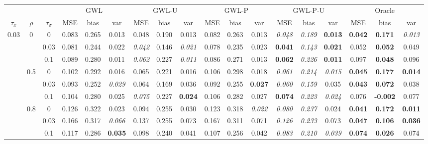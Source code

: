 \documentclass[authoryear, review, 10pt]{elsarticle}
\begin{document}
\begin{sidewaystable}[ht]
\begin{center}
\begin{tabular}{ccc|ccc|ccc|ccc|ccc|ccc}
&&&\multicolumn{3}{c}{GWL}&\multicolumn{3}{c}{GWL-U}&\multicolumn{3}{c}{GWL-P}&\multicolumn{3}{c}{GWL-P-U}&\multicolumn{3}{c}{Oracle}\\
$\tau_x$ & $\rho$ & $\tau_\sigma$ & MSE & bias & var &  MSE & bias & var &  MSE & bias & var &  MSE & bias & var &  MSE & bias & var\\ 
\hline
\multirow{9}{*}{0.03} & \multirow{3}{*}{0} & 0 & 0.083 & 0.265 & 0.013 & 0.048 & 0.190 & 0.013 & 0.082 & 0.263 & 0.013 & \emph{0.048} & \emph{0.189} & \textbf{0.013} & \textbf{0.042} & \textbf{0.171} & \emph{0.013} \\ 
 &  & 0.03 &   0.081 & 0.244 & 0.022 & \emph{0.042} & 0.146 & \emph{0.021} & 0.078 & 0.235 & 0.023 & \textbf{0.041} & \emph{0.143} & \textbf{0.021} & 0.052 & \textbf{0.052} & 0.049 \\ 
 &  & 0.1 &   0.089 & 0.280 & 0.011 & \emph{0.062} & 0.227 & \emph{0.011} & 0.086 & 0.271 & 0.013 & \textbf{0.062} & \emph{0.226} & \textbf{0.011} & 0.097 & \textbf{0.048} & 0.096 \\ \cline{2-18}
 & \multirow{3}{*}{0.5} & 0 &   0.102 & 0.292 & 0.016 & 0.065 & 0.221 & 0.016 & 0.106 & 0.298 & 0.018 & \emph{0.061} & \emph{0.214} & \emph{0.015} & \textbf{0.045} & \textbf{0.177} & \textbf{0.014} \\ 
 &  & 0.03 &   0.093 & 0.252 & \emph{0.029} & 0.064 & 0.169 & 0.036 & 0.092 & 0.255 & \textbf{0.027} & \emph{0.060} & \emph{0.159} & 0.035 & \textbf{0.043} & \textbf{0.072} & 0.038 \\ 
 &  & 0.1 &   0.104 & 0.280 & 0.025 & \emph{0.075} & 0.227 & \textbf{0.024} & 0.106 & 0.282 & 0.027 & \textbf{0.074} & \emph{0.223} & \emph{0.024} & 0.076 & \textbf{-0.002} & 0.077 \\ \cline{2-18}
 & \multirow{3}{*}{0.8} & 0 &   0.126 & 0.322 & 0.023 & 0.094 & 0.255 & 0.030 & 0.123 & 0.318 & \emph{0.022} & \emph{0.080} & \emph{0.237} & 0.024 & \textbf{0.041} & \textbf{0.172} & \textbf{0.011} \\ 
 &  & 0.03 &   0.166 & 0.317 & \emph{0.066} & 0.137 & 0.255 & 0.073 & 0.167 & 0.311 & 0.071 & \emph{0.126} & \emph{0.233} & 0.073 & \textbf{0.047} & \textbf{0.106} & \textbf{0.036} \\ 
 &  & 0.1 &   0.117 & 0.286 & \textbf{0.035} & 0.098 & 0.240 & 0.041 & 0.107 & 0.256 & 0.042 & \emph{0.083} & \emph{0.210} & \emph{0.039} & \textbf{0.074} & \textbf{0.026} & 0.074 \\ \cline{1-18}

\end{tabular}
\end{center}
\end{sidewaystable}
\end{document}
